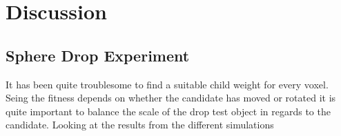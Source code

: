 \section{Discussion}

\subsection{Sphere Drop Experiment}
It has been quite troublesome to find a suitable child weight for every voxel.
Seing the fitness depends on whether the candidate has moved or rotated it is quite important
to balance the scale of the drop test object in regards to the candidate.
Looking at the results from the different simulations